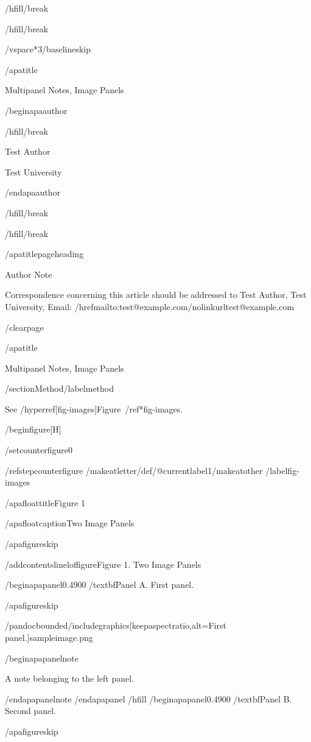 /hfill/break

/hfill/break

/vspace*{3/baselineskip}

/apatitle{

Multipanel Notes, Image Panels

}

/begin{apaauthor}

/hfill/break

Test Author

Test University

/end{apaauthor}

/hfill/break

/hfill/break

/apatitlepageheading{

Author Note

}

Correspondence concerning this article should be addressed to Test
Author, Test University, Email:
/href{mailto:test@example.com}{/nolinkurl{test@example.com}}

/clearpage

/apatitle{

Multipanel Notes, Image Panels

}

/section{Method}/label{method}

See /hyperref[fig-images]{Figure~/ref*{fig-images}}.

/begin{figure}[H]

/setcounter{figure}{0}

/refstepcounter{figure}%
/makeatletter/def/@currentlabel{1}/makeatother%
/label{fig-images}

/apafloattitle{Figure 1}

/apafloatcaption{Two Image Panels}

/apafigureskip

/addcontentsline{lof}{figure}{Figure 1. Two Image Panels}

/begin{apapanel}{0.4900}%
/textbf{Panel A}. First panel.

/apafigureskip

/pandocbounded{/includegraphics[keepaspectratio,alt={First panel.}]{sampleimage.png}}

/begin{apapanelnote}

A note belonging to the left panel.

/end{apapanelnote}
/end{apapanel}%
/hfill
/begin{apapanel}{0.4900}%
/textbf{Panel B}. Second panel.

/apafigureskip

